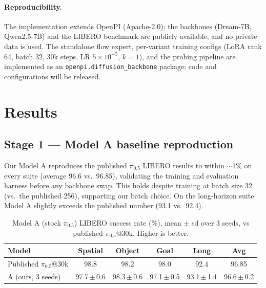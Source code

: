 \documentclass{article}
\begin{document}
\paragraph{Reproducibility.} The implementation extends OpenPI \cite{openpi}
(Apache-2.0); the backbones (Dream-7B, Qwen2.5-7B) and the LIBERO benchmark are
publicly available, and no private data is used. The standalone flow expert,
per-variant training configs (LoRA rank 64, batch 32, 30k steps, LR $5\times
10^{-5}$, $k{=}1$), and the probing pipeline are implemented as an
\texttt{openpi.diffusion\_backbone} package; code and configurations will be
released.

\section{Results}

\subsection{Stage 1 --- Model A baseline reproduction}
Our Model A reproduces the published $\pi_{0.5}$ LIBERO results to within
$\sim$1\% on every suite (average 96.6 vs.\ 96.85), validating the training and
evaluation harness before any backbone swap. This holds despite training at
batch size 32 (vs.\ the published 256), supporting our batch choice. On the
long-horizon suite Model A slightly exceeds the published number (93.1 vs.\ 92.4).

\begin{table}[t]
\centering
\caption{Model A (stock $\pi_{0.5}$) LIBERO success rate (\%), mean $\pm$ sd over
3 seeds, vs published $\pi_{0.5}$@30k. Higher is better.}
\begin{tabular}{lccccc}
\toprule
Model & Spatial & Object & Goal & Long & Avg \\
\midrule
Published $\pi_{0.5}$@30k & 98.8 & 98.2 & 98.0 & 92.4 & 96.85 \\
A (ours, 3 seeds) & 97.7\,$\pm$\,0.6 & 98.3\,$\pm$\,0.6 & 97.1\,$\pm$\,0.5 & 93.1\,$\pm$\,1.4 & 96.6\,$\pm$\,0.2 \\
\bottomrule
\end{tabular}
\end{table}
\end{document}
